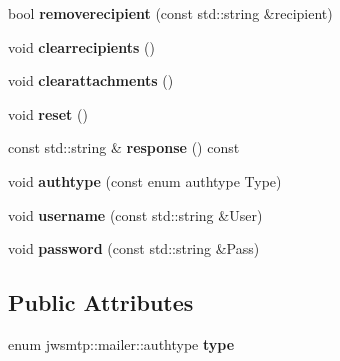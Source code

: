 \begin{DoxyCompactItemize}
\item 
\hypertarget{classjwsmtp_1_1mailer_aaf08ac5f9cfe7b2c2491cf9bd86dd2dc}{bool {\bfseries removerecipient} (const std\-::string \&recipient)}\label{classjwsmtp_1_1mailer_aaf08ac5f9cfe7b2c2491cf9bd86dd2dc}

\item 
\hypertarget{classjwsmtp_1_1mailer_abe98321f7402147da6d43726b7f0b72c}{void {\bfseries clearrecipients} ()}\label{classjwsmtp_1_1mailer_abe98321f7402147da6d43726b7f0b72c}

\item 
\hypertarget{classjwsmtp_1_1mailer_a77d2b39ec4855a741ac0156e242d5224}{void {\bfseries clearattachments} ()}\label{classjwsmtp_1_1mailer_a77d2b39ec4855a741ac0156e242d5224}

\item 
\hypertarget{classjwsmtp_1_1mailer_a4bf4b663e343bad40f658cef48f78521}{void {\bfseries reset} ()}\label{classjwsmtp_1_1mailer_a4bf4b663e343bad40f658cef48f78521}

\item 
\hypertarget{classjwsmtp_1_1mailer_a862d80a5c66fac98d254745fde7b1fb8}{const std\-::string \& {\bfseries response} () const }\label{classjwsmtp_1_1mailer_a862d80a5c66fac98d254745fde7b1fb8}

\item 
\hypertarget{classjwsmtp_1_1mailer_a13e354584e6b389b53db283105e1d995}{void {\bfseries authtype} (const enum authtype Type)}\label{classjwsmtp_1_1mailer_a13e354584e6b389b53db283105e1d995}

\item 
\hypertarget{classjwsmtp_1_1mailer_a8f43636be8ea428371915b611c508fc3}{void {\bfseries username} (const std\-::string \&User)}\label{classjwsmtp_1_1mailer_a8f43636be8ea428371915b611c508fc3}

\item 
\hypertarget{classjwsmtp_1_1mailer_ab0d3608eefc489f80c145530f45e1c49}{void {\bfseries password} (const std\-::string \&Pass)}\label{classjwsmtp_1_1mailer_ab0d3608eefc489f80c145530f45e1c49}

\end{DoxyCompactItemize}
\subsection*{Public Attributes}
\begin{DoxyCompactItemize}
\item 
\hypertarget{classjwsmtp_1_1mailer_a34be8c1b0f30f2e794629a463450df4e}{enum jwsmtp\-::mailer\-::authtype {\bfseries type}}\label{classjwsmtp_1_1mailer_a34be8c1b0f30f2e794629a463450df4e}

\end{DoxyCompactItemize}
